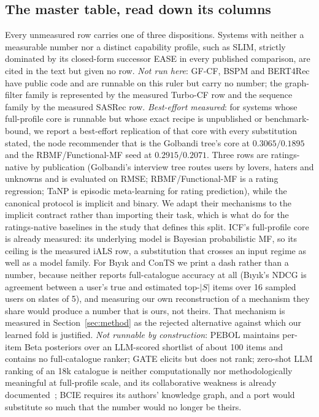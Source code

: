 \documentclass[manuscript,screen]{acmart}
\begin{document}
\subsection{The master table, read down its columns}
Every unmeasured row carries one of three dispositions. Systems with neither a measurable number nor a distinct capability profile, such as SLIM, strictly dominated by its closed-form successor EASE in every published comparison, are cited in the text but given no row. \emph{Not run here}: GF-CF, BSPM and BERT4Rec have public code and are runnable on this ruler but carry no number; the graph-filter family is represented by the measured Turbo-CF row and the sequence family by the measured SASRec row. \emph{Best-effort measured}: for systems whose full-profile core is runnable but whose exact recipe is unpublished or benchmark-bound, we report a best-effort replication of that core with every substitution stated, the node recommender that is the Golbandi tree's core at $0.3065/0.1895$ and the RBMF/Functional-MF seed at $0.2915/0.2071$. Three rows are ratings-native by publication (Golbandi's interview tree routes users by lovers, haters and unknowns and is evaluated on RMSE; RBMF/Functional-MF is a rating regression; TaNP is episodic meta-learning for rating prediction), while the canonical protocol is implicit and binary. We adapt their mechanisms to the implicit contract rather than importing their task, which is what \citet{liang2018variational} do for the ratings-native baselines in the study that defines this split. ICF's full-profile core is already measured: its underlying model is Bayesian probabilistic MF, so its ceiling is the measured iALS row, a substitution that crosses an input regime as well as a model family. For B\i y\i k and ConTS we print a dash rather than a number, because neither reports full-catalogue accuracy at all (B\i y\i k's NDCG is agreement between a user's true and estimated top-$|S|$ items over 16 sampled users on slates of 5), and measuring our own reconstruction of a mechanism they share would produce a number that is ours, not theirs. That mechanism is measured in Section~\ref{sec:method} as the rejected alternative against which our learned fold is justified. \emph{Not runnable by construction}: PEBOL maintains per-item Beta posteriors over an LLM-scored shortlist of about 100 items and contains no full-catalogue ranker; GATE elicits but does not rank; zero-shot LLM ranking of an 18k catalogue is neither computationally nor methodologically meaningful at full-profile scale, and its collaborative weakness is already documented~\citep{he2023large}; BCIE requires its authors' knowledge graph, and a port would substitute so much that the number would no longer be theirs.
\end{document}
